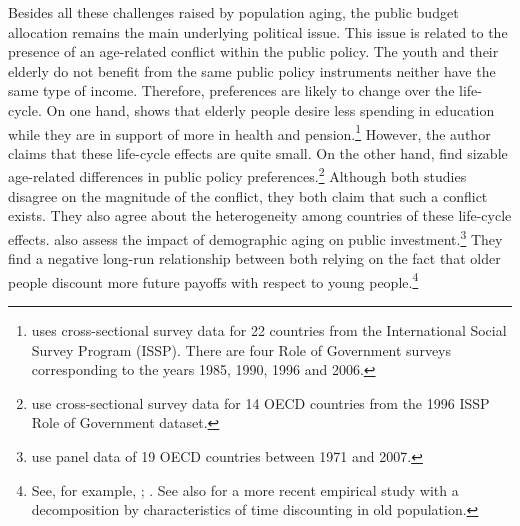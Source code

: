 Besides all these challenges raised by population aging, the public budget allocation remains the main underlying political issue. This issue is related to the presence of an age-related conflict within the public policy. The youth and their elderly do not benefit from the same public policy instruments neither have the same type of income. Therefore, preferences are likely to change over the life-cycle. On one hand, \cite{Sorensen2013} shows that elderly people desire less spending in education while they are in support of more in health and pension.\footnote{\cite{Sorensen2013} uses cross-sectional survey data for 22 countries from the International Social Survey Program (ISSP). There are four Role of Government surveys corresponding to the years 1985, 1990, 1996 and 2006.} However, the author claims that these life-cycle effects are quite small. On the other hand, \cite{Busemeyer2009} find sizable age-related differences in public policy preferences.\footnote{\cite{Busemeyer2009} use cross-sectional survey data for 14 OECD countries from the 1996 ISSP Role of Government dataset.} Although both studies disagree on the magnitude of the conflict, they both claim that such a conflict exists. They also agree about the heterogeneity among countries of these life-cycle effects. \cite{Jager2016} also assess the impact of demographic aging on public investment.\footnote{\cite{Jager2016} use panel data of 19 OECD countries between 1971 and 2007.} They find a negative long-run relationship between both relying on the fact that older people discount more future payoffs with respect to young people.\footnote{See, for example, \cite{Harrison2002}; \cite{Read2004}. See also \cite{Huffman2017} for a more recent empirical study with a decomposition by characteristics of time discounting in old population.}

